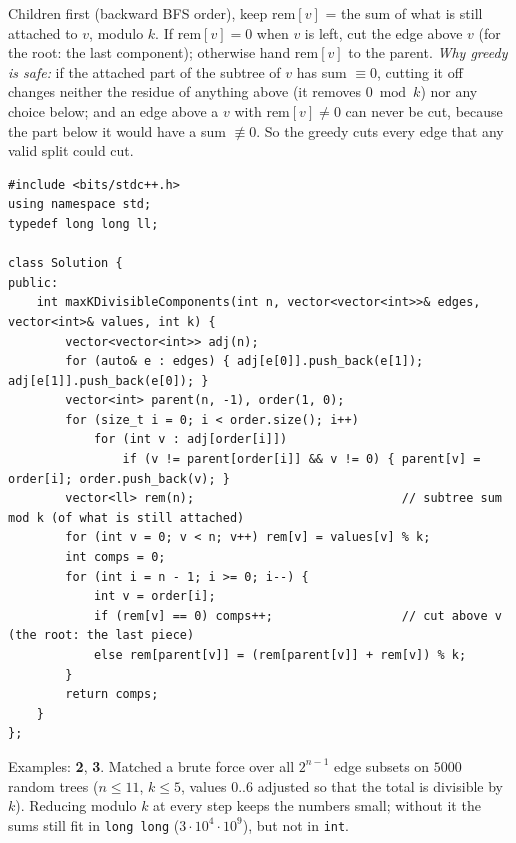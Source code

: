 \begin{solutionbox}
Children first (backward BFS order), keep $\mathrm{rem}[v]$ = the sum of what is still attached to $v$, modulo $k$. If $\mathrm{rem}[v] = 0$ when $v$ is left, cut the edge above $v$ (for the root: the last component); otherwise hand $\mathrm{rem}[v]$ to the parent. \emph{Why greedy is safe:} if the attached part of the subtree of $v$ has sum $\equiv 0$, cutting it off changes neither the residue of anything above (it removes $0 \bmod k$) nor any choice below; and an edge above a $v$ with $\mathrm{rem}[v] \ne 0$ can never be cut, because the part below it would have a sum $\not\equiv 0$. So the greedy cuts every edge that any valid split could cut.
\begin{center}
\end{center}
\begin{lstlisting}[style=cpp]
#include <bits/stdc++.h>
using namespace std;
typedef long long ll;

class Solution {
public:
    int maxKDivisibleComponents(int n, vector<vector<int>>& edges, vector<int>& values, int k) {
        vector<vector<int>> adj(n);
        for (auto& e : edges) { adj[e[0]].push_back(e[1]); adj[e[1]].push_back(e[0]); }
        vector<int> parent(n, -1), order(1, 0);
        for (size_t i = 0; i < order.size(); i++)
            for (int v : adj[order[i]])
                if (v != parent[order[i]] && v != 0) { parent[v] = order[i]; order.push_back(v); }
        vector<ll> rem(n);                             // subtree sum mod k (of what is still attached)
        for (int v = 0; v < n; v++) rem[v] = values[v] % k;
        int comps = 0;
        for (int i = n - 1; i >= 0; i--) {
            int v = order[i];
            if (rem[v] == 0) comps++;                  // cut above v (the root: the last piece)
            else rem[parent[v]] = (rem[parent[v]] + rem[v]) % k;
        }
        return comps;
    }
};
\end{lstlisting}
Examples: \textbf{2}, \textbf{3}. Matched a brute force over all $2^{n-1}$ edge subsets on $5000$ random trees ($n \le 11$, $k \le 5$, values $0..6$ adjusted so that the total is divisible by $k$). Reducing modulo $k$ at every step keeps the numbers small; without it the sums still fit in \texttt{long long} ($3\cdot10^4 \cdot 10^9$), but not in \texttt{int}.
\end{solutionbox}

